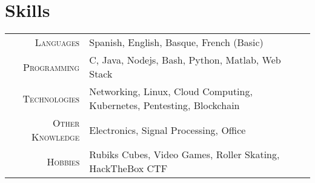\documentclass[a4paper,10pt]{article}
\begin{document}
\begin{tabular}{rp{13.6cm}}
\end{tabular}

 \vspace{-.3in}

\section{Skills}
\begin{tabular}{r|l}
\textsc{Languages} & Spanish, English, Basque, French (Basic) \\
\textsc{Programming} & C, Java, Nodejs, Bash, Python, Matlab, Web Stack \\
\textsc{Technologies} & Networking, Linux, Cloud Computing, Kubernetes, Pentesting, Blockchain  \\
\textsc{Other Knowledge} & Electronics, Signal Processing, Office \\
\textsc{Hobbies} & Rubiks Cubes, Video Games, Roller Skating, HackTheBox CTF
\end{tabular}
\end{document}
